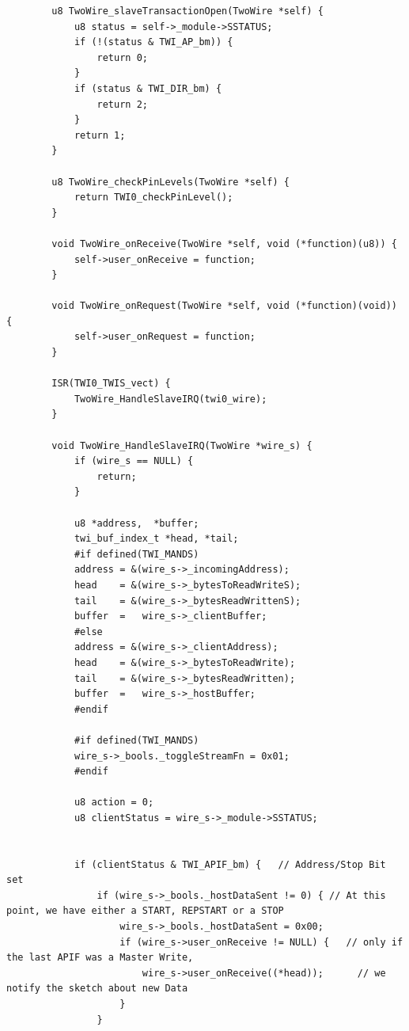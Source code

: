 \documentclass[11pt,a4paper,titlepage]{report}
\begin{document}
\begin{lstlisting}
		u8 TwoWire_slaveTransactionOpen(TwoWire *self) {
			u8 status = self->_module->SSTATUS;
			if (!(status & TWI_AP_bm)) {
				return 0;
			}
			if (status & TWI_DIR_bm) {
				return 2;
			}
			return 1;
		}
		
		u8 TwoWire_checkPinLevels(TwoWire *self) {
			return TWI0_checkPinLevel();
		}
		
		void TwoWire_onReceive(TwoWire *self, void (*function)(u8)) {
			self->user_onReceive = function;
		}
		
		void TwoWire_onRequest(TwoWire *self, void (*function)(void)) {
			self->user_onRequest = function;
		}
		
		ISR(TWI0_TWIS_vect) {
			TwoWire_HandleSlaveIRQ(twi0_wire);
		}
		
		void TwoWire_HandleSlaveIRQ(TwoWire *wire_s) {
			if (wire_s == NULL) {
				return;
			}
			
			u8 *address,  *buffer;
			twi_buf_index_t *head, *tail;
			#if defined(TWI_MANDS)
			address = &(wire_s->_incomingAddress);
			head    = &(wire_s->_bytesToReadWriteS);
			tail    = &(wire_s->_bytesReadWrittenS);
			buffer  =   wire_s->_clientBuffer;
			#else
			address = &(wire_s->_clientAddress);
			head    = &(wire_s->_bytesToReadWrite);
			tail    = &(wire_s->_bytesReadWritten);
			buffer  =   wire_s->_hostBuffer;
			#endif
			
			#if defined(TWI_MANDS)
			wire_s->_bools._toggleStreamFn = 0x01;
			#endif
			
			u8 action = 0;
			u8 clientStatus = wire_s->_module->SSTATUS;
			
			
			if (clientStatus & TWI_APIF_bm) {   // Address/Stop Bit set
				if (wire_s->_bools._hostDataSent != 0) { // At this point, we have either a START, REPSTART or a STOP
					wire_s->_bools._hostDataSent = 0x00;
					if (wire_s->user_onReceive != NULL) {   // only if the last APIF was a Master Write,
						wire_s->user_onReceive((*head));      // we notify the sketch about new Data
					}
				}
				

\end{lstlisting}
\end{document}
